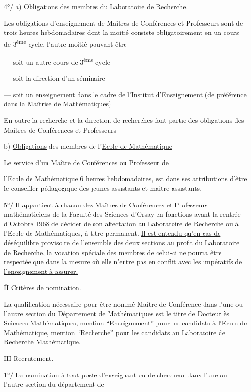 4°/ a) \uline{Obligations} des membres du \uline{Laboratoire de Recherche}.

Les obligations d'enseignement de Maîtres de Conférences et Professeurs sont de trois heures hebdomadaires dont la moitié consiste obligatoirement en un cours de 3\textsuperscript{ème} cycle, l'autre moitié pouvant être

--- soit un autre cours de 3\textsuperscript{ème} cycle

--- soit la direction d'un séminaire

--- soit un enseignement dans le cadre de l'Institut d'Enseignement (de préférence dans la Maîtrise de Mathématiques)

En outre la recherche et la direction de recherches font partie des obligations des Maîtres de Conférences et Professeurs

b) \uline{Obligations} des membres de l'\uline{Ecole de Mathématique}.

Le service d'un Maître de Conférences ou Professeur de


l'Ecole de Mathématique  6 heures hebdomadaires, est dans ses attributions d'être le conseiller pédagogique des jeunes assistants et maître-assistants.

5°/ Il appartient à chacun des Maîtres de Conférences et Professeurs mathématiciens de la Faculté des Sciences d'Orsay en fonctions avant la rentrée d'Octobre 1968 de décider de son affectation au Laboratoire de Recherche ou à l'Ecole de Mathématiques, à titre permanent. \uline{Il est entendu qu'en cas de déséquilibre provisoire de l'ensemble des deux sections au profit du Laboratoire de Recherche, la vocation spéciale des membres de celui-ci ne pourra être respectée que dans la mesure où elle n'entre pas en conflit avec les impératifs de l'enseignement à assurer.}

$\overline{\underline{\mathrm{II}}}$ Critères de nomination.

La qualification nécessaire pour être nommé Maître de Conférence dans l'une ou l'autre section du Département de Mathématiques est le titre de Docteur ès Sciences Mathématiques, mention ``Enseignement'' pour les candidats à l'Ecole de Mathématique, mention ``Recherche'' pour les candidats au Laboratoire de Recherche Mathématique.

$\overline{\underline{\mathrm{III}}}$ Recrutement.

1°/ La nomination à tout poste d'enseignant ou de chercheur dans l'une ou l'autre section du département de

